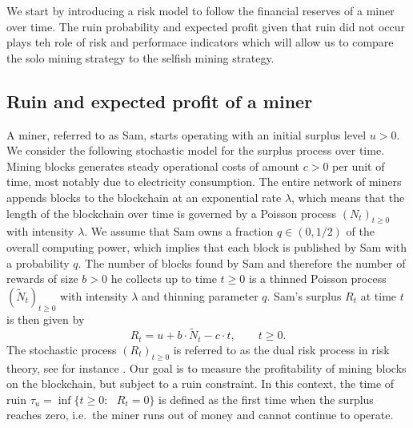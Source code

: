 \noindent We start by introducing a risk model to follow the financial reserves of a miner over time. The ruin probability and expected profit given that ruin did not occur plays teh role of risk and performace indicators which will allow us to compare the solo mining strategy to the selfish mining strategy.

\subsection{Ruin and expected profit of a miner}\label{ssec:selfish_mining}
A miner, referred to as Sam, starts operating with an initial surplus level $u>0$. We consider the following stochastic model for the surplus process over time. Mining blocks generates steady operational costs of amount $c>0$ per unit of time, most notably due to electricity consumption. The entire network of miners appends blocks to the blockchain at an exponential rate $\lambda$, which means that the length of the blockchain over time is governed by a Poisson process $(N_t)_{t\geq0}$ with intensity $\lambda$. We assume that Sam owns a fraction $q\in(0,1/2)$ of the overall computing power, which implies that each block is published by Sam with a probability $q$. The number of blocks found by Sam and therefore the number of rewards of size $b>0$ he collects up to time $t\geq 0$ is a thinned Poisson process $(\tilde{N}_t)_{t\geq0}$ with intensity $\lambda$ and thinning parameter $q$. Sam's surplus $R_t$ at time $t$ is then given by  
\begin{equation}\label{eq:surplus_protocol}
R_t = u + b\cdot\tilde{N}_t - c\cdot t,\qquad t\ge 0.
\end{equation}
The stochastic process $(R_t)_{t\geq0}$ is referred to as the dual risk process in risk theory, see for instance \citet{Avanzi2007}. Our goal is to measure the profitability of mining blocks on the blockchain, but subject to a ruin constraint. In this context, the time of ruin $\tau_u = \inf\{t\geq0:\text{ }R_t = 0\}$ is defined as the first time when the surplus reaches zero, i.e.\ the miner runs out of money and cannot continue to operate. 

